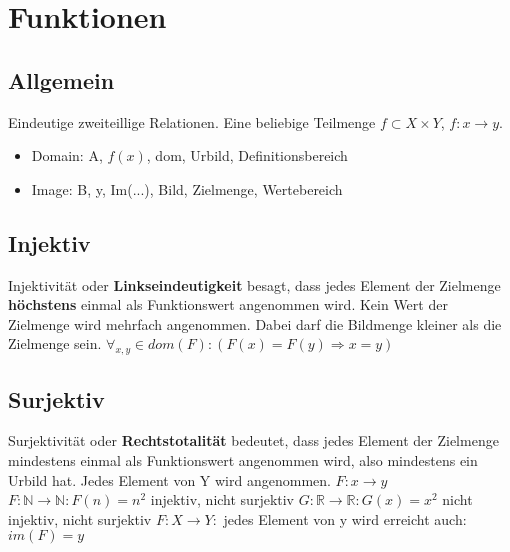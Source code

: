 \section{Funktionen}
\subsection{Allgemein}
    Eindeutige zweiteillige Relationen. Eine beliebige Teilmenge \(f
    \subset X \times Y \), \(f: x \rightarrow y \).\newline
    \begin{itemize}
      \item Domain: A, \(f(x)\), dom, Urbild, Definitionsbereich
      \item Image: B, y, Im(...), Bild, Zielmenge, Wertebereich
    \end{itemize}

\subsection{Injektiv}
Injektivität oder \textbf{Linkseindeutigkeit} besagt, dass jedes
    Element der Zielmenge \textbf{höchstens} einmal als Funktionswert angenommen
    wird. Kein Wert der Zielmenge wird mehrfach angenommen. Dabei darf die Bildmenge kleiner als die Zielmenge sein.\newline
\( \forall_{x,y} \in dom(F): (F(x) = F(y) \Rightarrow x = y) \)

\subsection{Surjektiv}
Surjektivität oder \textbf{Rechtstotalität} bedeutet, dass jedes
    Element der Zielmenge mindestens einmal als Funktionswert angenommen
    wird, also mindestens ein Urbild hat. Jedes Element von Y wird
    angenommen.
\(F: x \rightarrow y\) \newline
\(F: \mathbb{N} \rightarrow \mathbb{N}: F(n) = n^2 \) injektiv, nicht surjektiv\newline
\(G: \mathbb{R} \rightarrow \mathbb{R}: G(x) = x^2 \) nicht injektiv, nicht surjektiv\newline
\(F: X \rightarrow Y:\) jedes Element von y wird erreicht auch: \(im(F) =y\)

